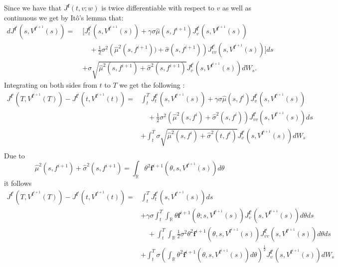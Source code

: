 \documentclass[oneside, a4paper, onecolumn, 11pt]{article}
\begin{document}
Since we have that $J^{\boldsymbol{f}}(t, v;w)$ is twice differentiable with respect to $v$ as well as continuous we get by Itô's lemma that: 
\begin{align*}
dJ^{\boldsymbol{f}^i}(s,V^{\boldsymbol{f}^{i+1}}(s)) =\; &\Bigg[ J^{\boldsymbol{f}^i}_t(s, V^{\boldsymbol{f}^{i+1}}(s))  
+  \gamma \sigma \hat{\mu}(s,f^{i+1})J^{\boldsymbol{f}^i}_{v}(s, V^{\boldsymbol{f}^{i+1}}(s)) \\
&\quad + \frac{1}{2} \sigma^2 \left( \hat{\mu}^2(s,f^{i+1}))  + \hat{\sigma}(s,f^{i+1}) \right) J^{\boldsymbol{f}^i}_{vv}(s, V^{\boldsymbol{f}^{i+1}}(s)) \Bigg] ds \\
&+ \sigma \sqrt{\hat{\mu}^2(s,f^{i+1})  + \hat{\sigma}^2(s,f^{i+1})} J^{\boldsymbol{f}^i}_{v}(s, V^{\boldsymbol{f}^{i+1}}(s)) dW_s.
\end{align*}
Integrating on both sides from $t$ to $T$ we get the following : 
\begin{align*}
J^{\boldsymbol{f}^i}(T,V^{\boldsymbol{f}^{i+1}}(T)) - J^{\boldsymbol{f}^i}(t,V^{\boldsymbol{f}^{i+1}}(t)) = &\int_{t}^{T} J^{\boldsymbol{f}^i}_t(s, V^{\boldsymbol{f}^{i+1}}(s))  
+  \gamma \sigma\hat{\mu}(s,f^i)J^{\boldsymbol{f}^i}_{v}(s, V^{\boldsymbol{f}^{i+1}}(s)) \\
&\quad + \frac{1}{2} \sigma^2 \left( \hat{\mu}^2(s,f^i)  + \hat{\sigma}^2(s,f^i) \right) J^{\boldsymbol{f}^i}_{vv}(s, V^{\boldsymbol{f}^{i+1}}(s))ds \\
&+ \int_{t}^{T} \sigma \sqrt{\hat{\mu}^2(s,f^i)  + \hat{\sigma}^2(t,f^i)} J^{\boldsymbol{f}^i}_{v}(s, V^{\boldsymbol{f}^{i+1}}(s)) dW_s\\  
\end{align*}
Due to 
$$\hat{\mu}^2(s,f^{i+1})  + \hat{\sigma}^2(s,f^{i+1}) = \int_{\mathbb{R}}\theta^2\boldsymbol{f}^{i+1}(\theta,s, V^{\boldsymbol{f}^{i+1}}(s))d\theta$$
it follows 
\begin{align*}
J^{\boldsymbol{f}^i}(T,V^{\boldsymbol{f}^{i+1}}(T)) - J^{\boldsymbol{f}^i}(t,V^{\boldsymbol{f}^{i+1}}(t)) = &\int_{t}^{T} J^{\boldsymbol{f}^i}_t(s, V^{\boldsymbol{f}^{i+1}}(s))  ds 
\\&+\gamma \sigma \int_{t}^{T} \int_{\mathbb{R}} \theta \boldsymbol{f}^{i+1}(\theta;s,V^{\boldsymbol{f}^{i+1}}(s)) J^{\boldsymbol{f}^i}_{v}(s, V^{\boldsymbol{f}^{i+1}}(s)) d\theta  ds \\
&\quad + \int_{t}^{T}\int_{\mathbb{R}}\frac{1}{2} \sigma^2 \theta^2 \boldsymbol{f}^{i+1}(\theta,s,V^{\boldsymbol{f}^{i+1}}(s)) J^{\boldsymbol{f}^i}_{vv}(s, V^{\boldsymbol{f}^{i+1}}(s)) d\theta ds  \\
&+ \int_{t}^{T} \sigma \left(\int_{\mathbb{R}}\theta^2 \boldsymbol{f}^{i+1}(\theta, s, V^{\boldsymbol{f}^{i+1}}(s))d\theta \right)^\frac{1}{2} J^{\boldsymbol{f}^i}_{v}(s, V^{\boldsymbol{f}^{i+1}}(s)) dW_s\\    
\end{align*}
\end{document}

